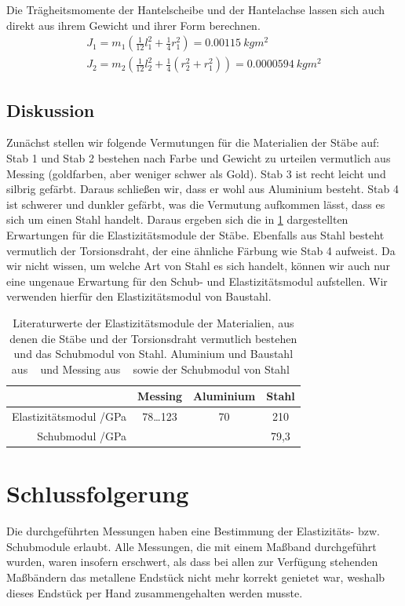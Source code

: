 \documentclass[
	a4paper,
	12pt,
	pagesize,
	ngerman
]{scrartcl}
\begin{document}
	Die Trägheitsmomente der Hantelscheibe und der Hantelachse lassen sich auch direkt aus ihrem Gewicht und ihrer Form berechnen.
	\begin{align}
		J_1 = m_1(\frac{1}{12}l_1^2+\frac{1}{4}r_1^2) = \SI{0,00115}{kgm^2}\\
		J_2 = m_2(\frac{1}{12}l_2^2+\frac{1}{4}(r_2^2 + r_1^2))= \SI{0,0000594}{kgm^2}
	\end{align}
	
	\subsection{Diskussion}
	Zunächst stellen wir folgende Vermutungen für die Materialien der Stäbe auf: Stab 1 und Stab 2 bestehen nach Farbe und Gewicht zu urteilen vermutlich aus Messing (goldfarben, aber weniger schwer als Gold). Stab 3 ist recht leicht und silbrig gefärbt. Daraus schließen wir, dass er wohl aus Aluminium besteht. Stab 4 ist schwerer und dunkler gefärbt, was die Vermutung aufkommen lässt, dass es sich um einen Stahl handelt. Daraus ergeben sich die in \cref{Tabelle_Elastizitätsmodule_Literatur} dargestellten Erwartungen für die Elastizitätsmodule der Stäbe. Ebenfalls aus Stahl besteht vermutlich der Torsionsdraht, der eine ähnliche Färbung wie Stab 4 aufweist. Da wir nicht wissen, um welche Art von Stahl es sich handelt, können wir auch nur eine ungenaue Erwartung für den Schub- und Elastizitätsmodul aufstellen. Wir verwenden hierfür den Elastizitätsmodul von Baustahl.
	
	\begin{table}[tb]
		\centering
		\begin{tabular}{ r | c | c | c |}
			&  Messing & Aluminium& Stahl\\ \hline
			Elastizitätsmodul /\si{\giga \pascal} & 78…123 & 70 & 210\\
			Schubmodul /\si{\giga \pascal} & & & 79,3 \\
			\hline
		\end{tabular}
		\caption{Literaturwerte der Elastizitätsmodule der Materialien, aus denen die Stäbe und der Torsionsdraht vermutlich bestehen und das Schubmodul von Stahl. Aluminium und Baustahl aus ~\cite[S. 624 f.]{Taschenbuch} und Messing aus ~\cite[S. E 66.]{Huette} sowie der Schubmodul von Stahl~\cite{Solids}} %
		\label{Tabelle_Elastizitätsmodule_Literatur} 
	\end{table}
	

	\section{Schlussfolgerung}
	Die durchgeführten Messungen haben eine Bestimmung der Elastizitäts- bzw. Schubmodule erlaubt.
	Alle Messungen, die mit einem Maßband durchgeführt wurden, waren insofern erschwert, als dass bei allen zur Verfügung stehenden Maßbändern das metallene Endstück nicht mehr korrekt genietet war, weshalb dieses Endstück per Hand zusammengehalten werden musste.
	\printbibliography
\end{document}
